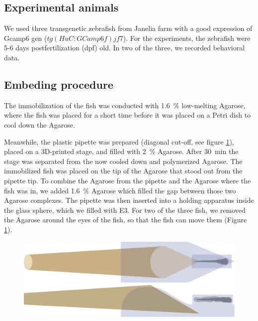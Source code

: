\subsection{Experimental animals}
We used three transgenetic zebrafish from Janelia farm with a good expression of Gcamp6 gen ($tg(HuC:GCamp6f)jf7$). For the experiments, the zebrafish were 5-6 days postfertilization (dpf) old. In two of the three, we recorded behavioral data.    

\subsection{Embeding procedure}

 The immobilization of the fish was conducted with \SI{1.6}{\percent} low-melting Agarose, where the fish was placed for a short time before it was placed on a Petri dish to cool down the Agarose. 

\vspace{\baselineskip}

\begin{minipage}[t]{0.5\textwidth} 
    Meanwhile, the plastic pipette was prepared (diagonal cut-off, see figure \ref{fig:stage}), placed on a 3D-printed stage, and filled with \SI{2}{\percent} Agarose. After \SI{30}{\minute} the stage was separated from the now cooled down and polymerized Agarose. The immobilized fish was placed on the tip of the Agarose that stood out from the pipette tip. To combine the Agarose from the pipette and the Agarose where the fish was in, we added \SI{1.6}{\percent} Agarose which filled the gap between those two Agarose complexes. The pipette was then inserted into a holding apparatus inside the glass sphere, which we filled with E3. For two of the three fish, we removed the Agarose around the eyes of the fish, so that the fish can move them (Figure \ref{fig:stage}). 
\end{minipage}%
\hfill%
\begin{minipage}[t]{0.45\textwidth}
\begin{figure}[H]
    \includegraphics[width=\linewidth]{figures/drawing.pdf}
    \label{fig:stage}
\end{figure}
\end{minipage}

